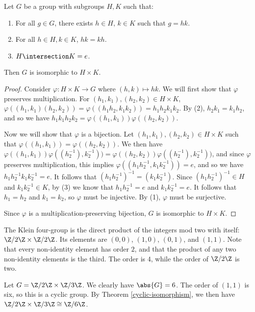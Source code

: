 \documentclass[12pt]{article}
\begin{document}
\begin{thm}
    Let $G$ be a group with subgroups $H,K$ such that:
    \begin{enumerate}[label=(\arabic*)]
        \item For all $g \in G$, there exists $h \in H$, $k \in K$ such that $g = hk$.
        \item For all $h \in H, k \in K$, $hk = kh$.
        \item $H \intersection K = e$.
    \end{enumerate}
    Then $G$ is isomorphic to $H \times K$.
\end{thm}

\begin{proof}
    Consider $\varphi: H \times K \to G$ where $(h, k) \mapsto hk$. We will first show that $\varphi$ preserves multiplication. For $(h_1, k_1), (h_2, k_2) \in H \times K$, $\varphi\left((h_1,k_1)(h_2,k_2)\right) = \varphi\left((h_1h_2,k_1k_2)\right) = h_1h_2k_1k_2$. By (2), $h_2k_1 = k_1h_2$, and so we have $h_1k_1h_2k_2 = \varphi((h_1, k_1))\varphi((h_2, k_2))$.

    Now we will show that $\varphi$ is a bijection. Let $(h_1,k_1), (h_2,k_2) \in H \times K$ such that $\varphi((h_1,k_1)) = \varphi((h_2,k_2))$. We then have $\varphi((h_1,k_1))\varphi((h_2^{-1}),k_2^{-1})) = \varphi((h_2,k_2))\varphi((h_2^{-1}),k_2^{-1}))$, and since $\varphi$ preserves multiplication, this implies $\varphi((h_1h_2^{-1},k_1k_2^{-1})) = e$, and so we have $h_1h_2^{-1}k_1k_2^{-1} = e$. It follows that $\left(h_1h_2^{-1}\right)^{-1} = \left(k_1k_2^{-1}\right)$. Since $\left(h_1h_2^{-1}\right)^{-1} \in H$ and $k_1k_2^{-1} \in K$, by (3) we know that $h_1h_2^{-1} = e$ and $k_1k_2^{-1} = e$. It follows that $h_1 = h_2$ and $k_1 = k_2$, so $\varphi$ must be injective. By (1), $\varphi$ must be surjective.

    Since $\varphi$ is a multiplication-preserving bijection, $G$ is isomorphic to $H \times K$.
\end{proof}

\begin{exmp}The Klein four-group is the direct product of the integers mod two with itself: $\Z/2\Z \times \Z/2\Z$. Its elements are $(0, 0)$, $(1, 0)$, $(0, 1)$, and $(1, 1)$. Note that every non-identity element has order $2$, and that the product of any two non-identity elements is the third. The order is $4$, while the order of $\Z/2\Z$ is two.
\end{exmp}

\begin{exmp}
    Let $G = \Z/2\Z \times \Z/3\Z$. We clearly have $\abs{G} = 6$. The order of $(1, 1)$ is six, so this is a cyclic group. By Theorem \ref{cyclic-isomorphism}, we then have $\Z/2\Z \times \Z/3\Z \cong \Z/6\Z$.
\end{exmp}
\end{document}
